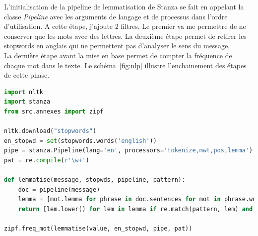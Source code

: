         L'initialisation de la pipeline de lemmatisation de Stanza se fait en appelant la classe \emph{Pipeline} avec les arguments de langage et de processus dans l'ordre d'utilisation.
        A cette étape, j'ajoute 2 filtres.
        Le premier va me permettre de ne conserver que les mots avec des lettres.
        La deuxième étape permet de retirer les stopwords en anglais qui ne permettent pas d'analyser le sens du message.\\
        La dernière étape avant la mise en base permet de compter la fréquence de chaque mot dans le texte.
        Le schéma~\ref{fig:nlp} illustre l'enchainement des étapes de cette phase.

        \begin{lstlisting}[title=Pipeline de lemmatisation, language=python]
import nltk
import stanza
from src.annexes import zipf

nltk.download("stopwords")
en_stopwd = set(stopwords.words('english'))
pipe = stanza.Pipeline(lang='en', processors='tokenize,mwt,pos,lemma')
pat = re.compile(r'\w+')

def lemmatise(message, stopwds, pipeline, pattern):
    doc = pipeline(message)
    lemma = [mot.lemma for phrase in doc.sentences for mot in phrase.words]
    return [lem.lower() for lem in lemma if re.match(pattern, lem) and lem.lower() not in stopwds]

zipf.freq_mot(lemmatise(value, en_stopwd, pipe, pat))
			\end{lstlisting}

